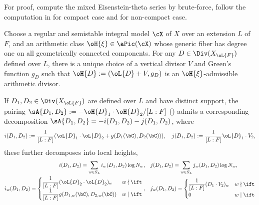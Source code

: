 \documentclass[article, a4paper, twoside]{universal}
\begin{document}
\begin{rmk}
    For proof, compute the mixed Eisenstein-theta series by brute-force, follow the computation in \cite[Proposition~4.5]{YZZ2013} for compact case and \cite[Theorem~4.15]{YZZ2013} for non-compact case.
\end{rmk}

\begin{stp}
    Choose a regular and semistable integral model $\cX$ of $X$ over an extension $L$ of $F$, and an arithmetic class $\oH{\xi}\in\aPic(\cX)$ whose generic fiber has degree one on all geometrically connected components. For any $D\in\Div(X_{\oL{F}})$ defined over $L$, there is a unique choice of a vertical divisor $V$ and Green's function $g_{D}$ such that $\oH{D}:=(\oL{D}+V,g_{D})$ is an $\oH{\xi}$-admissible arithmetic divisor.

    If $D_{1},D_{2}\in\Div(X_{\oL{F}})$ are defined over $L$ and have distinct support, the pairing $\sA{D_{1},D_{2}}:=-\oH{D}_{1}\cdot\oH{D}_{2}/[L:F]$ (\cite[Theorem~7.4]{YZZ2013}) admits a corresponding decomposition $\sA{D_{1},D_{2}}=-i(D_{1},D_{2})-j(D_{1},D_{2})$, where
    \[
        i(D_{1},D_{2}):=\frac{1}{[L:F]}(\oL{D}_{1}\cdot\oL{D}_{2}+g(D_{1}(\bC),D_{2}(\bC))),\quad j(D_{1},D_{2}):=\frac{1}{[L:F]}\oL{D}_{1}\cdot V_{2},
    \]
    these further decomposes into local heights,
    \begin{align*}
        i(D_{1},D_{2})=\sum_{w\in S_{L}}i_{w}(D_{1},D_{2})\log N_{w},&\quad j(D_{1},D_{2})=\sum_{w\in S_{L}}j_{w}(D_{1},D_{2})\log N_{w}, \\
        i_{w}(D_{1},D_{2})=\begin{cases}
          \dfrac{1}{[L:F]}(\oL{D}_{2}\cdot\oL{D}_{2})_{w} & w\nmid\ift \\
          \dfrac{1}{[L:F]}g(D_{1,w}(\bC),D_{2,w}(\bC)) & w\mid\ift
        \end{cases},&\quad j_{w}(D_{1},D_{2})=\begin{cases}
          \dfrac{1}{[L:F]}(D_{1}\cdot V_{2})_{w} & w\nmid\ift \\
          0 & w\mid\ift
        \end{cases}
    \end{align*}
\end{stp}
\end{document}
